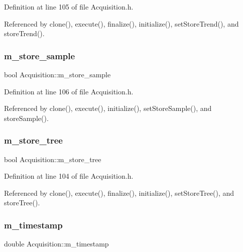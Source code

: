 Definition at line 105 of file Acquisition.\+h.



Referenced by clone(), execute(), finalize(), initialize(), set\+Store\+Trend(), and store\+Trend().

\mbox{\label{classAcquisition_a987cc1d04007cf1f5acc1accfd0909e5}} 
\subsubsection{\texorpdfstring{m\+\_\+store\+\_\+sample}{m\_store\_sample}}
{\footnotesize\ttfamily bool Acquisition\+::m\+\_\+store\+\_\+sample\hspace{0.3cm}{\ttfamily [private]}}



Definition at line 106 of file Acquisition.\+h.



Referenced by clone(), execute(), initialize(), set\+Store\+Sample(), and store\+Sample().

\mbox{\label{classAcquisition_aca2143e9135e25554e58327475a767c5}} 
\subsubsection{\texorpdfstring{m\+\_\+store\+\_\+tree}{m\_store\_tree}}
{\footnotesize\ttfamily bool Acquisition\+::m\+\_\+store\+\_\+tree\hspace{0.3cm}{\ttfamily [private]}}



Definition at line 104 of file Acquisition.\+h.



Referenced by clone(), execute(), finalize(), initialize(), set\+Store\+Tree(), and store\+Tree().

\mbox{\label{classAcquisition_aa88cf8d27e075b5aaddb309dfb42cd04}} 
\subsubsection{\texorpdfstring{m\+\_\+timestamp}{m\_timestamp}}
{\footnotesize\ttfamily double Acquisition\+::m\+\_\+timestamp\hspace{0.3cm}{\ttfamily [private]}}



